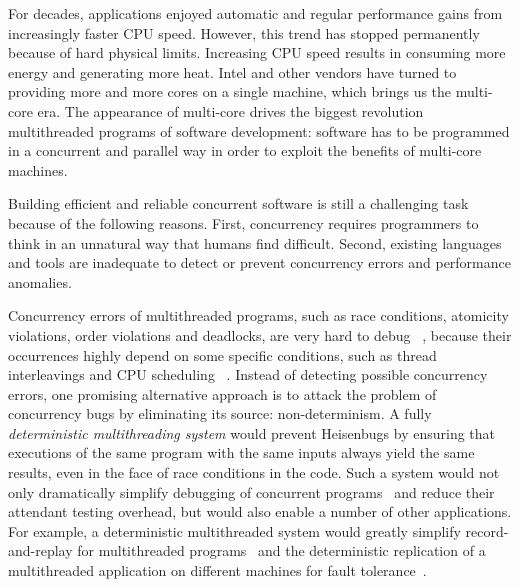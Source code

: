 For decades, applications enjoyed automatic and regular performance gains from increasingly faster CPU speed.  However, this trend has stopped permanently because of hard physical limits. Increasing CPU speed results in consuming more energy and generating more heat. Intel and other vendors have turned to providing more and more cores on a single machine, which brings us the multi-core era. The appearance of multi-core drives the biggest revolution multithreaded programs of software development: software has to be programmed in a concurrent and parallel way in order to exploit the benefits of multi-core machines.

Building efficient and reliable concurrent software is still a challenging task because of the following reasons. First, concurrency requires programmers to think in an unnatural way that humans find difficult.  Second, existing languages and tools are inadequate to detect or prevent concurrency errors and performance anomalies. 

Concurrency errors of multithreaded programs, such as race conditions, atomicity violations, order violations and deadlocks, are very hard to debug ~\cite{Lu:2008:LMC:1346281.1346323}, because their occurrences highly depend on some specific conditions, such as thread interleavings and CPU scheduling ~\cite{DBLP:conf/icse/BallBHMQ09,DBLP:conf/asplos/BurckhardtKMN10}. Instead of detecting possible concurrency errors, one promising alternative approach is to attack the problem of concurrency bugs by eliminating its source: non-determinism. A fully \emph{deterministic multithreading system} would prevent Heisenbugs by ensuring that executions of the same program with the same inputs always yield the same results, even in the face of race conditions in the code. Such a system would not only dramatically simplify debugging of concurrent
programs~\cite{Carver:1991:RTC:624586.625040} and reduce their attendant testing overhead, but would also enable a number of other applications. For example, a deterministic multithreaded system would greatly simplify record-and-replay for multithreaded programs~\cite{Choi:1998:DRJ:281035.281041,LeBlanc:1987:DPP:32387.32396} and the deterministic replication of a multithreaded application on different machines for fault tolerance~\cite{deterministic-process-groups,1134000,224058,replicant-hotos}.

